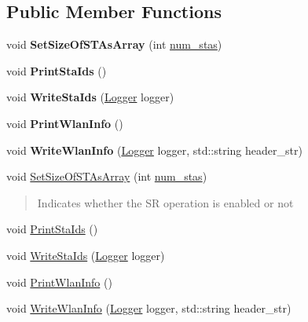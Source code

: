 \subsection*{Public Member Functions}
\begin{DoxyCompactItemize}
\item 
\mbox{\label{structWlan_a2e8b797ec5404eb24afef8e61ac5ab12}} 
void {\bfseries Set\+Size\+Of\+S\+T\+As\+Array} (int \hyperlink{structWlan_a53c3246a5649acd9a764e9b2ef8a76a1}{num\+\_\+stas})
\item 
\mbox{\label{structWlan_af4e4a70fe79d50c26429879d57fa1b95}} 
void {\bfseries Print\+Sta\+Ids} ()
\item 
\mbox{\label{structWlan_ab61a4af9882ac2df280ac073f6164521}} 
void {\bfseries Write\+Sta\+Ids} (\hyperlink{structLogger}{Logger} logger)
\item 
\mbox{\label{structWlan_a93adab5b705fd56386e625e6cad0ccfd}} 
void {\bfseries Print\+Wlan\+Info} ()
\item 
\mbox{\label{structWlan_a8a999685a03c0c478ae95b9dfb98dd01}} 
void {\bfseries Write\+Wlan\+Info} (\hyperlink{structLogger}{Logger} logger, std\+::string header\+\_\+str)
\item 
void \hyperlink{structWlan_a2e8b797ec5404eb24afef8e61ac5ab12}{Set\+Size\+Of\+S\+T\+As\+Array} (int \hyperlink{structWlan_a53c3246a5649acd9a764e9b2ef8a76a1}{num\+\_\+stas})
\begin{DoxyCompactList}\small\item\em \begin{quote}
Indicates whether the SR operation is enabled or not \end{quote}
\end{DoxyCompactList}\item 
void \hyperlink{structWlan_af4e4a70fe79d50c26429879d57fa1b95}{Print\+Sta\+Ids} ()
\item 
void \hyperlink{structWlan_ab61a4af9882ac2df280ac073f6164521}{Write\+Sta\+Ids} (\hyperlink{structLogger}{Logger} logger)
\item 
void \hyperlink{structWlan_a93adab5b705fd56386e625e6cad0ccfd}{Print\+Wlan\+Info} ()
\item 
void \hyperlink{structWlan_a8a999685a03c0c478ae95b9dfb98dd01}{Write\+Wlan\+Info} (\hyperlink{structLogger}{Logger} logger, std\+::string header\+\_\+str)
\end{DoxyCompactItemize}
